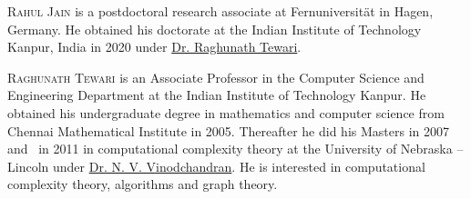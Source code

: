 \documentclass{toc}
\begin{document}
%
%
%
%
%
%
%
%
%
%
%
%
%
%
%
%
%
%
%
%
\begin{tocaboutauthors}
\begin{tocabout}[Jain]
  \textsc{Rahul Jain} is a postdoctoral research associate at Fernuniversit\"at in Hagen, Germany. He obtained his doctorate at the Indian Institute of Technology Kanpur, India in 2020 under \href{https://www.cse.iitk.ac.in/users/rtewari/}{Dr. Raghunath Tewari}.  %
%
%
\end{tocabout}


\begin{tocabout}[Tewari]
 \textsc{Raghunath Tewari} is an Associate Professor in the Computer Science and Engineering %
Department  %
at the Indian Institute of Technology Kanpur. He obtained his undergraduate degree in mathematics and computer science from Chennai Mathematical Institute in 2005.
%
Thereafter he did his Masters in 2007 and \phd\ in 2011 in computational complexity theory
%
at  %
the University of Nebraska -- Lincoln under \href{http://cse.unl.edu/~vinod/}{Dr. N. V. Vinodchandran}.  %
%
He is interested in computational complexity theory, algorithms and graph theory.

%
\end{tocabout}
\end{tocaboutauthors}
\end{document}
